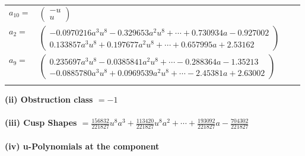 \documentclass[1p]{elsarticle_modified}
\theoremstyle{definition}
\begin{document}
\begin{tabular}{m{7pt} m{180pt} m{7pt} m{180pt} }
\flushright $a_{10}=$&$\begin{pmatrix}- u\\u\end{pmatrix}$ \\
\flushright $a_{2}=$&$\begin{pmatrix}-0.0970216 a^{3} u^{8}-0.329653 a^{2} u^{8}+\cdots+0.730934 a-0.927002\\0.133857 a^{3} u^{8}+0.197677 a^{2} u^{8}+\cdots+0.657995 a+2.53162\end{pmatrix}$ \\
\flushright $a_{9}=$&$\begin{pmatrix}0.235697 a^{3} u^{8}-0.0385841 a^{2} u^{8}+\cdots-0.288364 a-1.35213\\-0.0885780 a^{3} u^{8}+0.0969539 a^{2} u^{8}+\cdots-2.45381 a+2.63002\end{pmatrix}$\\&\end{tabular}
\flushleft \textbf{(ii) Obstruction class $= -1$}\\~\\
\flushleft \textbf{(iii) Cusp Shapes $= \frac{156832}{221827} u^8 a^3+\frac{113420}{221827} u^8 a^2+\cdots+\frac{193092}{221827} a-\frac{704302}{221827}$}\\~\\
\newpage\renewcommand{\arraystretch}{1}
\flushleft \textbf{(iv) u-Polynomials at the component}\newline \\
\end{document}
